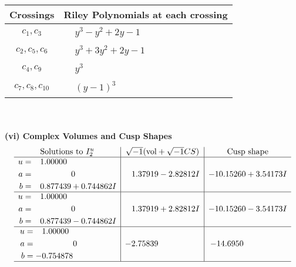 \documentclass[1p]{elsarticle_modified}
\theoremstyle{definition}
\newcommand{\I}{\sqrt{-1}}
\begin{document}
\begin{tabular}{m{50pt}|m{274pt}}
Crossings & \hspace{64pt}Riley Polynomials at each crossing \\
\hline $$\begin{aligned}c_{1},c_{3}\end{aligned}$$&$\begin{aligned}
&y^3- y^2+2 y-1
\end{aligned}$\\
\hline $$\begin{aligned}c_{2},c_{5},c_{6}\end{aligned}$$&$\begin{aligned}
&y^3+3 y^2+2 y-1
\end{aligned}$\\
\hline $$\begin{aligned}c_{4},c_{9}\end{aligned}$$&$\begin{aligned}
&y^3
\end{aligned}$\\
\hline $$\begin{aligned}c_{7},c_{8},c_{10}\end{aligned}$$&$\begin{aligned}
&(y-1)^3
\end{aligned}$\\
\hline
\end{tabular}\\~\\
\newpage\flushleft \textbf{(vi) Complex Volumes and Cusp Shapes}
$$\begin{array}{c|c|c}  
\text{Solutions to }I^u_{2}& \I (\text{vol} + \sqrt{-1}CS) & \text{Cusp shape}\\
 \hline 
\begin{aligned}
u &= \phantom{-}1.00000\phantom{ +0.000000I} \\
a &= \phantom{-0.000000 } 0 \\
b &= \phantom{-}0.877439 + 0.744862 I\end{aligned}
 & \phantom{-}1.37919 - 2.82812 I & -10.15260 + 3.54173 I \\ \hline\begin{aligned}
u &= \phantom{-}1.00000\phantom{ +0.000000I} \\
a &= \phantom{-0.000000 } 0 \\
b &= \phantom{-}0.877439 - 0.744862 I\end{aligned}
 & \phantom{-}1.37919 + 2.82812 I & -10.15260 - 3.54173 I \\ \hline\begin{aligned}
u &= \phantom{-}1.00000\phantom{ +0.000000I} \\
a &= \phantom{-0.000000 } 0 \\
b &= -0.754878\phantom{ +0.000000I}\end{aligned}
 & -2.75839\phantom{ +0.000000I} & -14.6950\phantom{ +0.000000I}\\
 \hline 
 \end{array}$$\newpage
\end{document}
